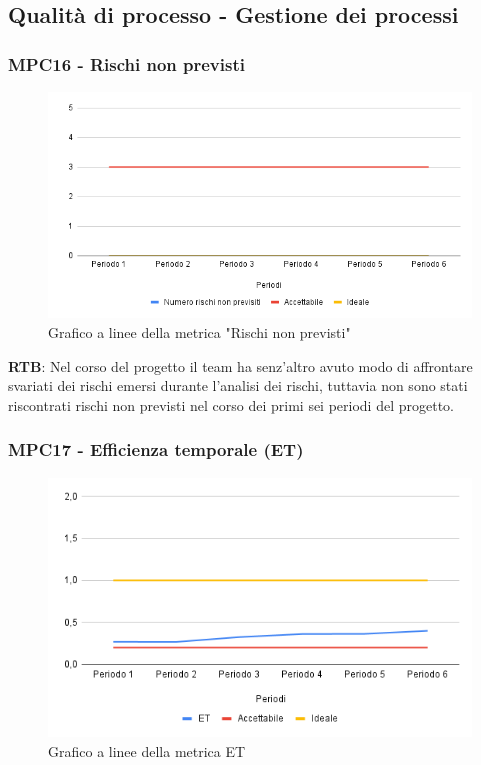 \documentclass[10pt]{article}
\begin{document}
\begin{justify}
\subsection{Qualità di processo - Gestione dei processi}
\subsubsection{MPC16 - Rischi non previsti}

\begin{figure}[H]
  \centering
  \includegraphics[width=0.9\linewidth]{RNP.png}
  \caption{Grafico a linee della metrica "Rischi non previsti"}
  \label{fig:RNPchart}
\end{figure}

\textbf{RTB}: Nel corso del progetto il team ha senz'altro avuto modo di affrontare svariati dei rischi emersi durante l'analisi dei rischi, tuttavia non sono stati
riscontrati rischi non previsti nel corso dei primi sei periodi del progetto.


\subsubsection{MPC17 - Efficienza temporale (ET)}

\begin{figure}[H]
  \centering
  \includegraphics[width=0.9\linewidth]{ET.png}
  \caption{Grafico a linee della metrica ET}
  \label{fig:ETchart}
\end{figure}


\end{justify}
\end{document}

